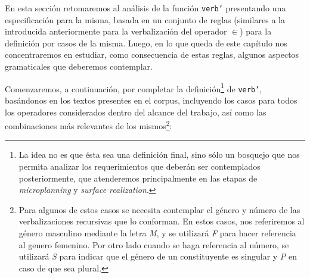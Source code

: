 En esta sección retomaremos al análisis de la función \texttt{verb'} presentando una especificación para la misma, basada en un conjunto de reglas (similares a la introducida anteriormente para la verbalización del operador $\in$) para la definición por casos de la misma. Luego, en lo que queda de este capítulo nos concentraremos en estudiar, como consecuencia de estas reglas, algunos aspectos gramaticales que deberemos contemplar.

Comenzaremos, a continuación, por completar la definición\footnote{La idea no es que ésta sea una definición final, sino sólo un bosquejo que nos permita analizar los requerimientos que deberán ser contemplados posteriormente, que atenderemos principalmente en las etapas de \textit{microplanning} y \textit{surface realization}.} de \texttt{verb'}, basándonos en los textos presentes en el corpus, incluyendo los casos para todos los operadores considerados dentro del alcance del trabajo, así como las combinaciones más relevantes de los mismos\footnote{Para algunos de estos casos se necesita contemplar el género y número de las verbalizaciones recursivas que lo conforman. En estos casos, nos referiremos al género masculino mediante la letra \emph{M}, y se utilizará \emph{F} para hacer referencia al genero femenino. Por otro lado cuando se haga referencia al número, se utilizará \emph{S} para indicar que el género de un constituyente es singular y \emph{P} en caso de que sea plural.}:

